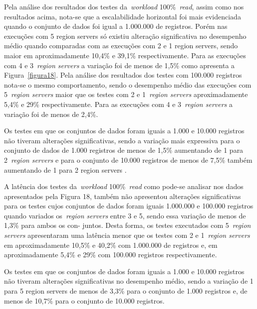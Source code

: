\documentclass[12pt]{article}
\begin{document}
Pela análise dos resultados dos testes da~\emph{workload} 100\%~\emph{read}, assim como nos resultados acima, nota-se que a escalabilidade horizontal foi mais evidenciada quando o conjunto de dados foi igual a 1.000.000 de registros. 
Porém nas execuções com 5 region servers só existiu alteração significativa no desempenho médio quando comparadas com as execuções com 2 e 1 region servers, sendo maior em aproximadamente 10,4\% e 39,1\% respectivamente. 
Para as execuções com 4 e 3~\emph{region servers} a variação foi de menos de 1,5\% como apresenta a Figura~\ref{figura18}.
Pela análise dos resultados dos testes com 100.000 registros nota-se o mesmo comportamento, sendo o desempenho médio das execuções com 5~\emph{region servers} maior que os testes com 2 e 1~\emph{region servers} aproximadamente 5,4\% e 29\% respectivamente.
Para as execuções com 4 e 3~\emph{region servers} a variação foi de menos de 2,4\%.

Os testes em que os conjuntos de dados foram iguais a 1.000 e 10.000 registros não tiveram alterações significativas, sendo a variação mais expressiva para o conjunto de dados de 1.000 registros de menos de 1,5\% aumentando de 1 para 2~\emph{region servers} e para o conjunto de 10.000 registros de menos de 7,5\% também aumentando de 1 para 2 region servers .

A latência dos testes da~\emph{workload} 100\%~\emph{read} como pode-se analisar nos dados apresentados pela Figura 18, também não apresentou alterações significativas para os testes cujos conjuntos de dados foram iguais 1.000.000 e 100.000 registros quando variados os~\emph{region servers} entre 3 e 5, sendo essa variação de menos de 1,3\% para ambos os con- juntos. Desta forma, os testes executados com 5~\emph{region servers} apresentaram uma latência menor que os testes com 2 e 1~\emph{region servers} em aproximadamente 10,5\% e 40,2\% com 1.000.000 de registros e, em aproximadamente 5,4\% e 29\% com 100.000 registros respectivamente.

Os testes em que os conjuntos de dados foram iguais a 1.000 e 10.000 registros não tiveram alterações significativas no desempenho médio, sendo a variação de 1 para 5 region servers de menos de 3,3\% para o conjunto de 1.000 registros e, de menos de 10,7\% para o conjunto de 10.000 registros.
\end{document}

